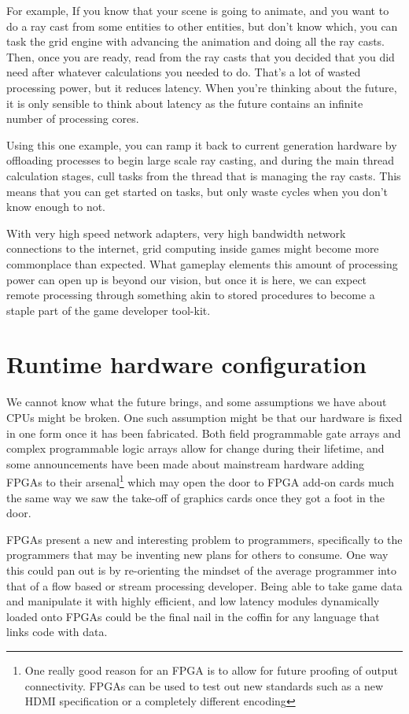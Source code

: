 For example, If you know that your scene is going to animate, and you want to
do a ray cast from some entities to other entities, but don't know which, you
can task the grid engine with advancing the animation and doing all the ray
casts. Then, once you are ready, read from the ray casts that you decided that
you did need after whatever calculations you needed to do. That's a lot of
wasted processing power, but it reduces latency. When you're thinking about the
future, it is only sensible to think about latency as the future contains an
infinite number of processing cores.

Using this one example, you can ramp it back to current generation hardware by
offloading processes to begin large scale ray casting, and during the main
thread calculation stages, cull tasks from the thread that is managing the ray
casts. This means that you can get started on tasks, but only waste cycles when
you don't know enough to not.

With very high speed network adapters, very high bandwidth network connections
to the internet, grid computing inside games might become more commonplace than
expected. What gameplay elements this amount of processing power can open up is
beyond our vision, but once it is here, we can expect remote processing through
something akin to stored procedures to become a staple part of the game
developer tool-kit.

\section{Runtime hardware configuration}

We cannot know what the future brings, and some assumptions we have about CPUs
might be broken. One such assumption might be that our hardware is fixed in one
form once it has been fabricated. Both field programmable gate arrays and
complex programmable logic arrays allow for change during their lifetime, and
some announcements have been made about mainstream hardware adding FPGAs to
their arsenal\footnote{One really good reason for an FPGA is to allow for
future proofing of output connectivity. FPGAs can be used to test out new
standards such as a new HDMI specification or a completely different encoding}
which may open the door to FPGA add-on cards much the same way we saw the
take-off of graphics cards once they got a foot in the door.

FPGAs present a new and interesting problem to programmers, specifically to the
programmers that may be inventing new plans for others to consume. One way this
could pan out is by re-orienting the mindset of the average programmer into
that of a flow based or stream processing developer. Being able to take game
data and manipulate it with highly efficient, and low latency modules
dynamically loaded onto FPGAs could be the final nail in the coffin for any
language that links code with data.

